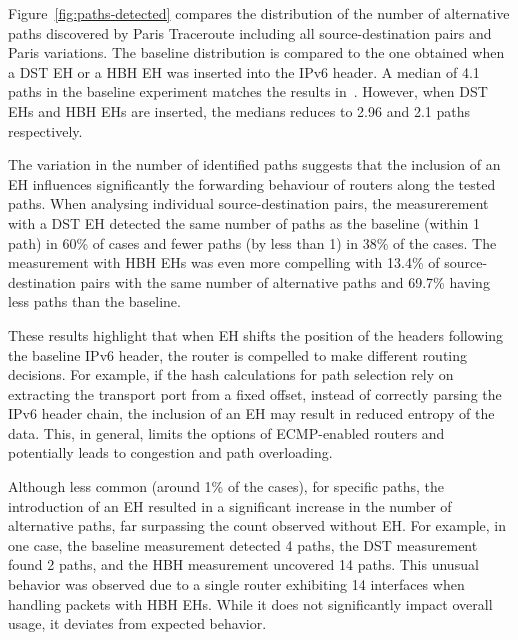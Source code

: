 \documentclass[conference]{IEEEtran}
\begin{document}
Figure~\ref{fig:paths-detected} compares the distribution of the number of
alternative paths discovered by Paris Traceroute including all
source-destination pairs and Paris variations.  The baseline distribution is
compared to the one obtained when a DST EH or a HBH EH was inserted into the
IPv6 header.  A median of 4.1 paths in the baseline experiment matches the
results in~\cite{augustin2006avoiding}.  However, when DST EHs and HBH EHs are
inserted, the medians reduces to 2.96 and 2.1 paths respectively.  



The variation in the number of identified paths suggests that the inclusion of
an EH influences significantly the forwarding behaviour of routers along the
tested paths.  When analysing individual source-destination pairs, the
measurerement with a DST EH detected the same number of paths as the baseline
(within 1 path) in 60\% of cases and fewer paths (by less than 1) in 38\% of
the cases.  The measurement with HBH EHs was even more compelling with 13.4\%
of source-destination pairs with the same number of alternative paths and
69.7\% having less paths than the baseline.

These results highlight that when EH shifts the position of the headers
following the baseline IPv6 header, the router is compelled to make different
routing decisions.  For example, if the hash calculations for path selection
rely on extracting the transport port from a fixed offset, instead of correctly
parsing the IPv6 header chain, the inclusion of an EH may result in reduced
entropy of the data.  This, in general, limits the options of ECMP-enabled
routers and potentially leads to congestion and path overloading.



Although less common (around 1\% of the cases), for specific paths, the introduction
of an EH resulted in a significant increase in the number of alternative paths,
far surpassing the count observed without EH.
For example, in one case, the baseline measurement detected 4 paths, the DST
measurement found 2 paths, and the HBH measurement uncovered 14 paths. This
unusual behavior was observed due to a single router exhibiting 14 interfaces
when handling packets with HBH EHs. While it does not significantly impact
overall usage, it deviates from expected behavior.
\end{document}

